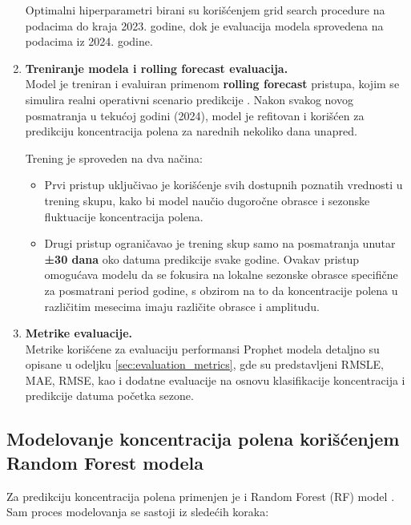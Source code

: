 \documentclass[12pt]{article}
\begin{document}
\begin{enumerate}
    Optimalni hiperparametri birani su korišćenjem grid search procedure na podacima do kraja 2023. godine, dok je evaluacija modela sprovedena na podacima iz 2024. godine.



    \item \textbf{Treniranje modela i rolling forecast evaluacija.} \\
    Model je treniran i evaluiran primenom \textbf{rolling forecast} pristupa, kojim se simulira realni operativni scenario predikcije \cite{bergmeir2012use}. Nakon svakog novog posmatranja u tekućoj godini (2024), model je refitovan i korišćen za predikciju koncentracija polena za narednih nekoliko dana unapred.

    Trening je sproveden na dva načina:
    \begin{itemize}
        \item Prvi pristup uključivao je korišćenje svih dostupnih poznatih vrednosti u trening skupu, kako bi model naučio dugoročne obrasce i sezonske fluktuacije koncentracija polena.
        \item Drugi pristup ograničavao je trening skup samo na posmatranja unutar \textbf{±30 dana} oko datuma predikcije svake godine. Ovakav pristup omogućava modelu da se fokusira na lokalne sezonske obrasce specifične za posmatrani period godine, s obzirom na to da koncentracije polena u različitim mesecima imaju različite obrasce i amplitudu.
    \end{itemize}

    \item \textbf{Metrike evaluacije.} \\
    Metrike korišćene za evaluaciju performansi Prophet modela detaljno su opisane u odeljku \ref{sec:evaluation_metrics}, gde su predstavljeni RMSLE, MAE, RMSE, kao i dodatne evaluacije na osnovu klasifikacije koncentracija i predikcije datuma početka sezone.

\end{enumerate}

\subsection{Modelovanje koncentracija polena korišćenjem Random Forest modela}

Za predikciju koncentracija polena primenjen je i Random Forest (RF) model \cite{breiman2001}.
Sam proces modelovanja se sastoji iz sledećih koraka:
\end{document}

